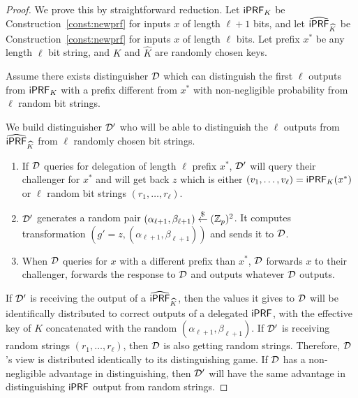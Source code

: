 \begin{proof}
  We prove this by straightforward reduction.  Let $\mathsf{i}\mathsf{PRF}_K$ be
  Construction~\ref{const:newprf} for inputs $x$ of length $\ell+1$
  bits, and let $\widehat{\mathsf{i}\mathsf{PRF}}_{\widehat{K}}$ be
  Construction~\ref{const:newprf} for inputs $x$ of length $\ell$
  bits.  Let prefix $x^*$ be any length $\ell$ bit string, and $K$ and
  $\widehat{K}$ are randomly chosen keys.

  Assume there exists distinguisher ${\mathcal{D}}$ which can distinguish the
  first $\ell$ outputs from $\mathsf{i}\mathsf{PRF}_K$ with a prefix different from $x^*$
  with non-negligible probability from $\ell$ random bit strings.

  We build distinguisher ${\mathcal{D}}'$ who will be able to distinguish the
  $\ell$ outputs from $\widehat{\mathsf{i}\mathsf{PRF}}_{\widehat{K}}$ from $\ell$
  randomly chosen bit strings.

\begin{enumerate}
\item If ${\mathcal{D}}$ queries for delegation of length $\ell$ prefix $x^*$,
  ${\mathcal{D}}'$ will query their challenger for $x^*$ and will get back $z$
  which is either $(v_1,\ldots,v_\ell)=\mathsf{i}\mathsf{PRF}_K(x^*)$ or $\ell$ random
  bit strings $(r_1,\ldots,r_\ell)$.
\item ${\mathcal{D}}'$ generates a random pair
  $(\alpha_{\ell+1},\beta_{\ell+1})\stackrel{\$}{\leftarrow}(\mathbb{Z}_p)^2$.  It computes
  transformation $(g'=z, (\alpha_{\ell+1},\beta_{\ell+1}))$ and sends it
  to ${\mathcal{D}}$.
\item When ${\mathcal{D}}$ queries for $x$ with a different prefix than $x^*$, ${\mathcal{D}}$
forwards $x$ to their challenger, forwards the response to ${\mathcal{D}}$ and
outputs whatever ${\mathcal{D}}$ outputs.
  
\end{enumerate}  
If ${\mathcal{D}}'$ is receiving the output of a $\widehat{\mathsf{i}\mathsf{PRF}}_{\widehat{K}}$,
then the values it gives to ${\mathcal{D}}$ will be identifically distributed to
correct outputs of a delegated $\mathsf{i}\mathsf{PRF}$, with the effective key of $K$
concatenated with the random $(\alpha_{\ell+1}, \beta_{\ell+1})$.  If
${\mathcal{D}}'$ is receiving random strings $(r_1,\ldots,r_\ell)$, then ${\mathcal{D}}$ is also
getting random strings.  Therefore, ${\mathcal{D}}$'s view is distributed
identically to its distinguishing game. If ${\mathcal{D}}$ has a non-negligible advantage in distinguishing, then
${\mathcal{D}}'$ will have the same advantage in distinguishing $\mathsf{i}\mathsf{PRF}$ output from random strings.
\end{proof}
